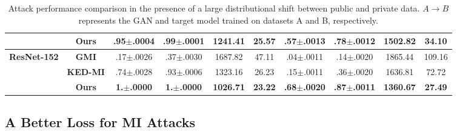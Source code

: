\documentclass[letterpaper]{article} %
\begin{document}
\begin{table}[ht!]
{\begin{tabular}{@{}cccccccccc@{}}
                                          & \textbf{Ours}   & \textbf{.95$\pm$.0004}               & \textbf{.99$\pm$.0001}               & \textbf{1241.41}               & \textbf{25.57}           & \textbf{.57$\pm$.0013}             & \textbf{.78$\pm$.0012}                & \textbf{1502.82}              & \textbf{34.10}           \\ \midrule
    \multirow{3}{*}{\textbf{ResNet-152}}  & \textbf{GMI}    & .17$\pm$.0026                        & .37$\pm$.0030                        & 1687.82                        & 47.11                    & .04$\pm$.0011                      & .14$\pm$.0020                         & 1865.44                       & 109.16                   \\
                                          & \textbf{KED-MI} & .74$\pm$.0028                        & .93$\pm$.0006                        & 1323.16                        & 26.23                    & .15$\pm$.0011                      & .36$\pm$.0020                         & 1636.81                       & 72.72                    \\
                                          & \textbf{Ours}   & \textbf{1.$\pm$.0000}                & \textbf{1.$\pm$.0000}                & \textbf{1026.71}               & \textbf{23.22}           & \textbf{.68$\pm$.0020}             & \textbf{.87$\pm$.0011}                & \textbf{1360.67}              & \textbf{27.49}           \\ \bottomrule
\end{tabular}
}
\caption{Attack performance comparison in the presence of a large distributional shift between public and private data. $A \rightarrow B$ represents the GAN and target model trained on datasets A and B, respectively.}
\label{tab: cross_dataset_results}
\end{table}


\subsection{A Better Loss for MI Attacks}
\end{document}
